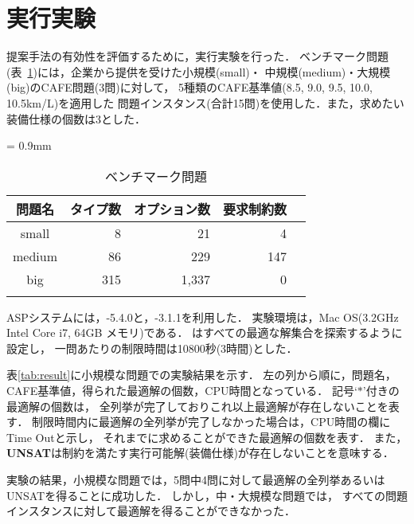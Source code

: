 \section{実行実験}
提案手法の有効性を評価するために，実行実験を行った．
ベンチマーク問題(表~\ref{tab:bench})には，企業から提供を受けた小規模(small)・
中規模(medium)・大規模(big)のCAFE問題(3問)に対して，
5種類のCAFE基準値(8.5, 9.0, 9.5, 10.0, 10.5km/L)を適用した
問題インスタンス(合計15問)を使用した．また，求めたい装備仕様の個数は3とした．

\begin{table}[tb]
  \caption{ベンチマーク問題}
  \centering
  \tabcolsep = 0.9mm
  \begin{tabular}{crrrr} \bhline
    問題名 & タイプ数	& オプション数	& 要求制約数 	\\\hline
    small	    & 8		& 21	& 4	  	        \\
    medium    & 86	& 229	& 147	  	        \\
    big	    & 315	& 1,337	& 0	          	\\\hline
    & & & \\
  \end{tabular}
 \label{tab:bench}
\end{table}

ASPシステムには，{\clingo}-5.4.0と，{\asprin}-3.1.1を利用した．
実験環境は，Mac OS(3.2GHz Intel Core i7, 64GB メモリ)である．
{\asprin}はすべての最適な解集合を探索するように設定し，
一問あたりの制限時間は10800秒(3時間)とした．

表\ref{tab:result}に小規模な問題での実験結果を示す．
左の列から順に，問題名，CAFE基準値，得られた最適解の個数，CPU時間となっている．
記号`$\ast$'付きの最適解の個数は，
全列挙が完了しておりこれ以上最適解が存在しないことを表す．
制限時間内に最適解の全列挙が完了しなかった場合は，CPU時間の欄にTime Outと示し，
それまでに求めることができた最適解の個数を表す．
また，{\bf UNSAT}は制約を満たす実行可能解(装備仕様)が存在しないことを意味する．

実験の結果，小規模な問題では，5問中4問に対して最適解の全列挙あるいはUNSATを得ることに成功した．
しかし，中・大規模な問題では，
すべての問題インスタンスに対して最適解を得ることができなかった．



